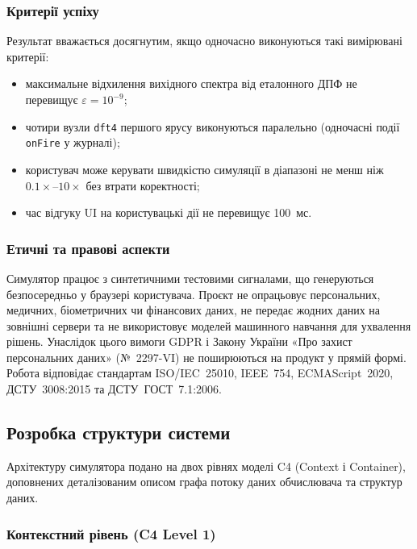 \documentclass[14pt,a4paper]{extarticle}
\begin{document}
\subsubsection*{Критерії успіху}

Результат вважається досягнутим, якщо одночасно виконуються такі
вимірювані критерії:
\begin{itemize}
  \item максимальне відхилення вихідного спектра від еталонного ДПФ
        не перевищує $\varepsilon = 10^{-9}$;
  \item чотири вузли \texttt{dft4} першого ярусу виконуються
        паралельно (одночасні події \texttt{onFire} у журналі);
  \item користувач може керувати швидкістю симуляції в діапазоні
        не менш ніж $0.1\times$--$10\times$ без втрати коректності;
  \item час відгуку UI на користувацькі дії не перевищує 100~мс.
\end{itemize}

\subsubsection*{Етичні та правові аспекти}

Симулятор працює з синтетичними тестовими сигналами, що генеруються
безпосередньо у браузері користувача. Проєкт не опрацьовує
персональних, медичних, біометричних чи фінансових даних, не передає
жодних даних на зовнішні сервери та не використовує моделей
машинного навчання для ухвалення рішень. Унаслідок цього вимоги
GDPR і Закону України «Про захист персональних даних» (№~2297-VI)
не поширюються на продукт у прямій формі. Робота відповідає
стандартам ISO/IEC~25010, IEEE~754, ECMAScript~2020,
ДСТУ~3008:2015 та ДСТУ~ГОСТ~7.1:2006.

\subsection{Розробка структури системи}

Архітектуру симулятора подано на двох рівнях моделі C4 (Context і
Container), доповнених деталізованим описом графа потоку даних
обчислювача та структур даних.

\subsubsection*{Контекстний рівень (C4 Level 1)}
\end{document}
